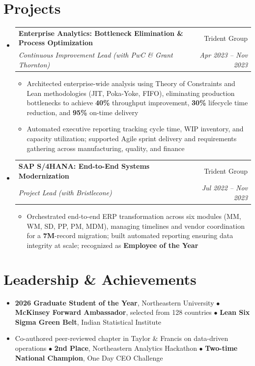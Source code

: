 \documentclass[letterpaper,10pt]{article}
\makeatletter
\newcommand{\resumeSubheading}[4]{
  \vspace{1pt}\item
    \begin{tabular*}{0.97\textwidth}[t]{l@{\extracolsep{\fill}}r}
      \textbf{#1} & #2 \\
      \textit{\small#3} & \textit{\small #4} \\
    \end{tabular*}\vspace{-4pt}
}
\newcommand{\resumeItem}[1]{\item\small{{#1 \vspace{-1pt}}}}
\newcommand{\resumeItemListStart}{\begin{itemize}[leftmargin=0.15in, label=$\bullet$]}
\newcommand{\resumeItemListEnd}{\end{itemize}\vspace{-2pt}}
\newcommand{\resumeSubHeadingListStart}{\begin{itemize}[leftmargin=0.15in, label={}]}
\newcommand{\resumeSubHeadingListEnd}{\end{itemize}}
\makeatother
\begin{document}
\section{Projects}
\resumeSubHeadingListStart
\resumeSubheading
{Enterprise Analytics: Bottleneck Elimination \& Process Optimization}{Trident Group}
{Continuous Improvement Lead (with PwC \& Grant Thornton)}{Apr 2023 -- Nov 2023}
\resumeItemListStart
\resumeItem{Architected enterprise-wide analysis using Theory of Constraints and Lean methodologies (JIT, Poka-Yoke, FIFO), eliminating production bottlenecks to achieve \textbf{40\%} throughput improvement, \textbf{30\%} lifecycle time reduction, and \textbf{95\%} on-time delivery}
\resumeItem{Automated executive reporting tracking cycle time, WIP inventory, and capacity utilization; supported Agile sprint delivery and requirements gathering across manufacturing, quality, and finance}
\resumeItemListEnd
\resumeSubheading
{SAP S/4HANA: End-to-End Systems Modernization}{Trident Group}
{Project Lead (with Bristlecone)}{Jul 2022 -- Nov 2023}
\resumeItemListStart
\resumeItem{Orchestrated end-to-end ERP transformation across six modules (MM, WM, SD, PP, PM, MDM), managing timelines and vendor coordination for a \textbf{7M}-record migration; built automated reporting ensuring data integrity at scale; recognized as \textbf{Employee of the Year}}
\resumeItemListEnd
\resumeSubHeadingListEnd
\section{Leadership \& Achievements}
\resumeItemListStart
\resumeItem{\textbf{2026 Graduate Student of the Year}, Northeastern University $\bullet$ \textbf{McKinsey Forward Ambassador}, selected from 128 countries $\bullet$ \textbf{Lean Six Sigma Green Belt}, Indian Statistical Institute}
\resumeItem{Co-authored peer-reviewed chapter in Taylor \& Francis on data-driven operations $\bullet$ \textbf{2nd Place}, Northeastern Analytics Hackathon $\bullet$ \textbf{Two-time National Champion}, One Day CEO Challenge}
\resumeItemListEnd
\end{document}

